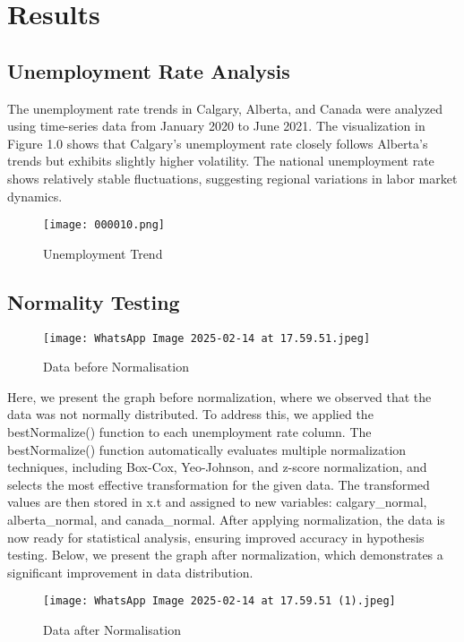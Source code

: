 \documentclass[11pt]{article}
\begin{document}
\section{Results}
\subsection{Unemployment Rate Analysis}
The unemployment rate trends in Calgary, Alberta, and Canada were analyzed using time-series data from January 2020 to June 2021. The visualization in Figure 1.0 shows that Calgary’s unemployment rate closely follows Alberta’s trends but exhibits slightly higher volatility. The national unemployment rate shows relatively stable fluctuations, suggesting regional variations in labor market dynamics.
\begin{figure}[H]
    \centering
    \texttt{[image: 000010.png]}
    \caption{Unemployment Trend}
    \label{fig:enter-label}
\end{figure}
\newpage
\subsection{Normality Testing}
\begin{figure}[h]
    \centering
    \texttt{[image: WhatsApp Image 2025-02-14 at 17.59.51.jpeg]}
    \caption{Data before Normalisation}
    \label{fig:enter-label}
\end{figure}
Here, we present the graph before normalization, where we observed that the data was not normally distributed. To address this, we applied the bestNormalize() function to each unemployment rate column.
The bestNormalize() function automatically evaluates multiple normalization techniques, including Box-Cox, Yeo-Johnson, and z-score normalization, and selects the most effective transformation for the given data. The transformed values are then stored in x.t and assigned to new variables: calgary\_normal, alberta\_normal, and canada\_normal.
After applying normalization, the data is now ready for statistical analysis, ensuring improved accuracy in hypothesis testing. Below, we present the graph after normalization, which demonstrates a significant improvement in data distribution.
\begin{figure}[H]
    \centering
    \texttt{[image: WhatsApp Image 2025-02-14 at 17.59.51 (1).jpeg]}
    \caption{Data after Normalisation}
    \label{fig:enter-label}
\end{figure}
\end{document}

